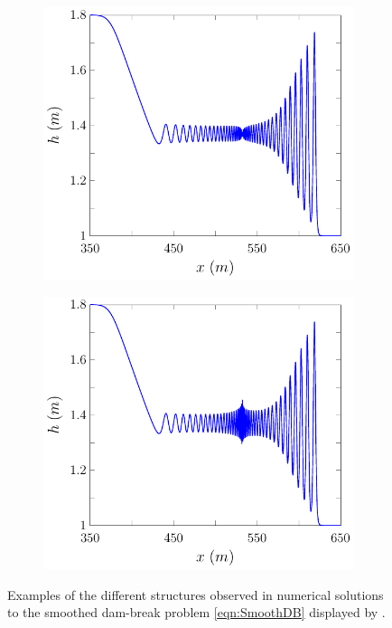 \begin{figure}
\begin{subfigure}{0.5\textwidth}
		\vspace{0.5cm}
	\end{subfigure}
	\begin{subfigure}{0.5\textwidth}
		\includegraphics[width=\textwidth]{./chp2/figures/DamBreakStruct/9.pdf}
		\vspace{0.5cm}
	\end{subfigure}%
	\begin{subfigure}{0.5\textwidth}
		\includegraphics[width=\textwidth]{./chp2/figures/DamBreakStruct/20.pdf}
		\vspace{0.5cm}
	\end{subfigure}
	\caption{Examples of the different structures observed in numerical solutions to the smoothed dam-break problem \eqref{eqn:SmoothDB} displayed by \citet{Pitt-2018-61}.}
	\label{fig:DBExAll}
\end{figure}

